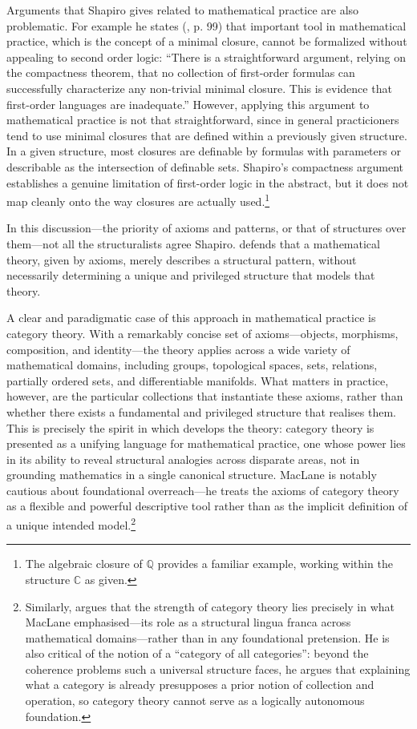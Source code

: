 \documentclass[11pt,a4paper]{book}
\theoremstyle{plain}
\begin{document}
Arguments that Shapiro gives related to mathematical practice are also problematic. For example he states (\citeyear{shapiro1991foundations}, p. 99) that important tool in mathematical practice, which is the concept of a minimal closure, cannot be formalized without appealing to second order logic: ``There is a straightforward argument, relying on the compactness theorem, that no collection of first-order formulas can successfully characterize any non-trivial minimal closure. This is evidence that first-order languages are inadequate.'' However, applying this argument to mathematical practice is not that straightforward, since in general practicioners tend to use minimal closures that are defined within a previously given structure. In a given structure, most closures are definable by formulas with parameters or describable as the intersection of definable sets. Shapiro's compactness argument establishes a genuine limitation of first-order logic in the abstract, but it does not map cleanly onto the way closures are actually used.\footnote{The algebraic closure of $\mathbb{Q}$ provides a familiar example, working within the structure $\mathbb{C}$ as given.}

In this discussion---the priority of axioms and patterns, or that of structures over them---not all the structuralists agree Shapiro. \textcite[Chapter 7]{Resnik1997} defends that a mathematical theory, given by axioms, merely describes a structural pattern, without necessarily determining a unique and privileged structure that models that theory.

A clear and paradigmatic case of this approach in mathematical practice is category theory. With a remarkably concise set of axioms---objects, morphisms, composition, and identity---the theory applies across a wide variety of mathematical domains, including groups, topological spaces, sets, relations, partially ordered sets, and differentiable manifolds. What matters in practice, however, are the particular collections that instantiate these axioms, rather than whether there exists a fundamental and privileged structure that realises them. This is precisely the spirit in which \textcite{maclane1998categories} develops the theory: category theory is presented as a unifying language for mathematical practice, one whose power lies in its ability to reveal structural analogies across disparate areas, not in grounding mathematics in a single canonical structure. MacLane is notably cautious about foundational overreach---he treats the axioms of category theory as a flexible and powerful descriptive tool rather than as the implicit definition of a unique intended model.\footnote{Similarly, \textcite{Feferman2013Category} argues that the strength of category theory lies precisely in what MacLane emphasised---its role as a structural lingua franca across mathematical domains---rather than in any foundational pretension. He is also critical of the notion of a ``category of all categories'': beyond the coherence problems such a universal structure faces, he argues that explaining what a category is already presupposes a prior notion of collection and operation, so category theory cannot serve as a logically autonomous foundation.}
\end{document}
